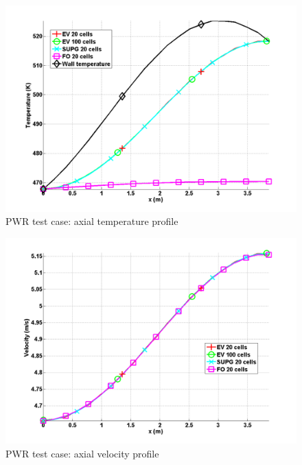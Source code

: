 %
\begin{figure}[ht]
\centering
\includegraphics[width=\textwidth]{figures/PWR_stt_temperature.png}
\caption{PWR test case: axial temperature profile}
\label{fig:Temperature}
\end{figure}
%
\begin{figure}[ht]
\centering
\includegraphics[width=\textwidth]{figures/PWR_stt_velocity.png}
\caption{PWR test case: axial velocity profile}
\label{fig:Velocity}
\end{figure}
%
